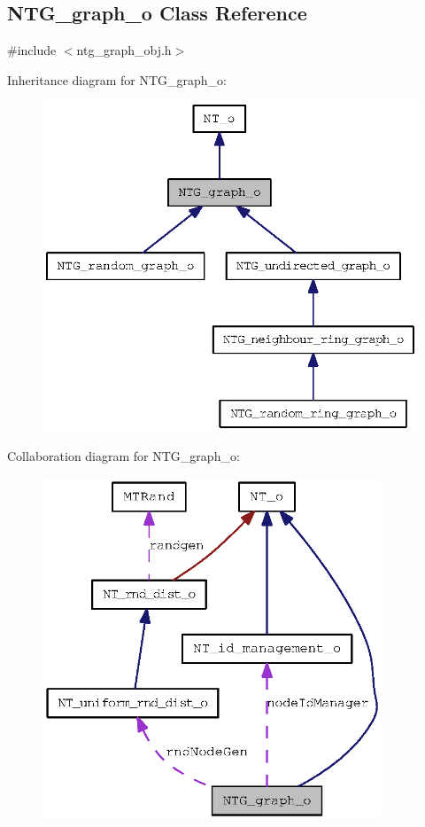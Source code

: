 \subsection{NTG\_\-graph\_\-o Class Reference}
\label{class_n_t_g__graph__o}


{\ttfamily \#include $<$ntg\_\-graph\_\-obj.h$>$}



Inheritance diagram for NTG\_\-graph\_\-o:
\nopagebreak
\begin{figure}[H]
\begin{center}
\leavevmode
\includegraphics[width=333pt]{class_n_t_g__graph__o__inherit__graph}
\end{center}
\end{figure}


Collaboration diagram for NTG\_\-graph\_\-o:
\nopagebreak
\begin{figure}[H]
\begin{center}
\leavevmode
\includegraphics[width=287pt]{class_n_t_g__graph__o__coll__graph}
\end{center}
\end{figure}

